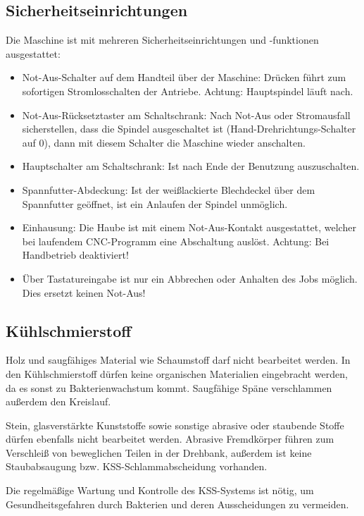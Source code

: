 \documentclass{\basedir/fablab-document}
\begin{document}
\subsection{Sicherheitseinrichtungen}
Die Maschine ist mit mehreren Sicherheitseinrichtungen und -funktionen ausgestattet:
\begin{itemize}
	\item Not-Aus-Schalter auf dem Handteil über der Maschine: Drücken führt zum sofortigen Stromlosschalten der Antriebe. Achtung: Hauptspindel läuft nach.
	\item Not-Aus-Rücksetztaster am Schaltschrank: Nach Not-Aus oder Stromausfall sicherstellen, dass die Spindel ausgeschaltet ist (Hand-Drehrichtungs-Schalter auf 0), dann mit diesem Schalter die Maschine wieder anschalten.
	\item Hauptschalter am Schaltschrank: Ist nach Ende der Benutzung auszuschalten.
	\item Spannfutter-Abdeckung: Ist der weißlackierte Blechdeckel über dem Spannfutter geöffnet, ist ein Anlaufen der Spindel unmöglich.
	\item Einhausung: Die Haube ist mit einem Not-Aus-Kontakt ausgestattet, welcher bei laufendem CNC-Programm eine Abschaltung auslöst. Achtung: Bei Handbetrieb deaktiviert!
	\item Über Tastatureingabe ist nur ein Abbrechen oder Anhalten des Jobs möglich. Dies ersetzt keinen Not-Aus!
\end{itemize}

\subsection{Kühlschmierstoff}
Holz und saugfähiges Material wie Schaumstoff darf nicht bearbeitet werden. In den Kühlschmierstoff dürfen keine organischen Materialien eingebracht werden, da es sonst zu Bakterienwachstum kommt. Saugfähige Späne verschlammen außerdem den Kreislauf.

Stein, glasverstärkte Kunststoffe sowie sonstige abrasive oder staubende Stoffe dürfen ebenfalls nicht bearbeitet werden. Abrasive Fremdkörper führen zum Verschleiß von beweglichen Teilen in der Drehbank, außerdem ist keine Staubabsaugung bzw. KSS-Schlammabscheidung vorhanden.

Die regelmäßige Wartung und Kontrolle des KSS-Systems ist nötig, um Gesundheitsgefahren durch Bakterien und deren Ausscheidungen zu vermeiden.

\end{document}
